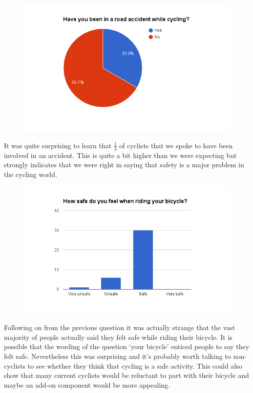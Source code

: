 \documentclass[a4paper]{report}
\begin{document}
{\begin{figure}[H]
\centering
\includegraphics[scale=0.6]{figures/research_report/questionnaires/drivers_3}
\end{figure}
It was quite surprising to learn that $\frac{1}{3}$ of cyclists that we spoke to have been involved in an accident. This is quite  a bit higher than we were expecting but strongly indicates that we were right in saying that safety is a major problem in the cycling world.
\begin{figure}[H]
\centering
\includegraphics[scale=0.6]{figures/research_report/questionnaires/drivers_4}
\end{figure}
Following on from the previous question it was actually strange that the vast majority of people actually said they felt safe while riding their bicycle. It is possible that the wording of the question `your bicycle' enticed people to say they felt safe. Nevertheless this was surprising and it's probably worth talking to non-cyclists to see whether they think that cycling is a safe activity. This could also show that many current cyclists would be reluctant to part with their bicycle and maybe an add-on component would be more appealing.
}
\end{document}
